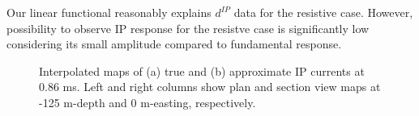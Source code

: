 \documentclass[extra,mreferee]{gji}
\newcommand{\dip}{d^{IP}}
\begin{document}
Our linear functional reasonably explains $\dip$ data for the resistive case. However, possibility to observe IP response for the resistve case is significantly low considering its small amplitude compared to fundamental response. 

\begin{figure}
  \caption{Interpolated maps of (a) true and (b) approximate IP currents at 0.86 ms. Left and right columns show plan and section view maps at -125 m-depth and 0 m-easting, respectively. }
  \label{F:IPcurrent_PlanandSec_early}
\end{figure}
\end{document}
